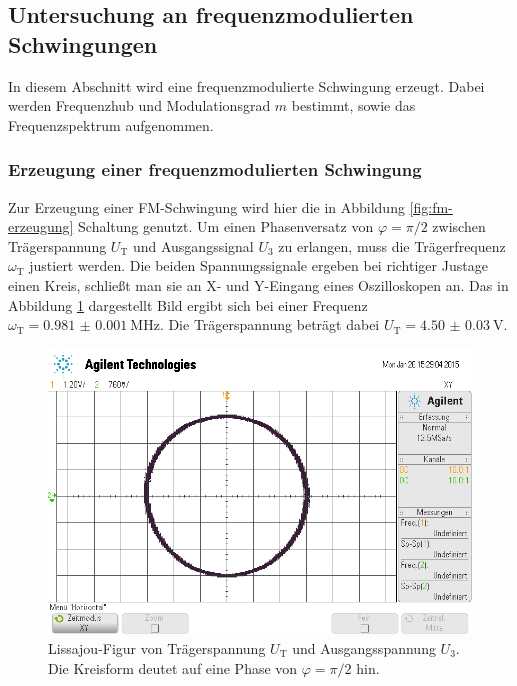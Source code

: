 \subsection{Untersuchung an frequenzmodulierten Schwingungen}
\label{subsec:fm-auswertung}
In diesem Abschnitt wird eine frequenzmodulierte Schwingung erzeugt.
Dabei werden Frequenzhub und Modulationsgrad $m$ bestimmt, sowie
das Frequenzspektrum aufgenommen.

\subsubsection{Erzeugung einer frequenzmodulierten Schwingung}
\label{subsubsec:fm-erzeugung}
Zur Erzeugung einer FM-Schwingung wird hier die in Abbildung
\ref{fig:fm-erzeugung} Schaltung genutzt.
Um einen Phasenversatz von $\varphi = \pi/2$ zwischen Trägerspannung
$U_\text{T}$ und Ausgangssignal $U_3$ zu erlangen, muss die
Trägerfrequenz $\omega_\text{T}$ justiert werden.
Die beiden Spannungssignale ergeben bei richtiger Justage einen Kreis,
schließt man sie an X- und Y-Eingang eines Oszilloskopen an.
Das in Abbildung \ref{fig:fm-kreis} dargestellt Bild ergibt sich
bei einer Frequenz $\omega_\text{T} = \SI{0.981(1)}{\mega\hertz}$.
Die Trägerspannung beträgt dabei $U_\text{T} = \SI{4.50(3)}{\volt}$.
\begin{figure}
        \centering
        \includegraphics[width=0.8\linewidth]{images/fm-kreis.png}
        \caption{Lissajou-Figur von Trägerspannung $U_\text{T}$ und
        Ausgangsspannung $U_3$. Die Kreisform deutet auf eine Phase von
        $\varphi=\pi/2$ hin.}
        \label{fig:fm-kreis}
\end{figure}

